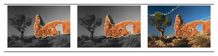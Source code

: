 \documentclass[smallextended]{svjour3}       %
\begin{document}
{{\begin{figure}[hp!]
\begin{tabular}{ccc}
		\includegraphics[scale=0.2]{images/segmentation/bc/rock/gc-seg.png} &
		\includegraphics[scale=0.2]{images/segmentation/bc/rock/corrected-seg.png} &					\includegraphics[scale=0.2]{images/segmentation/schoenemann/rock/rock-seg.png}\\

\end{tabular}
\end{figure}}}
\end{document}
